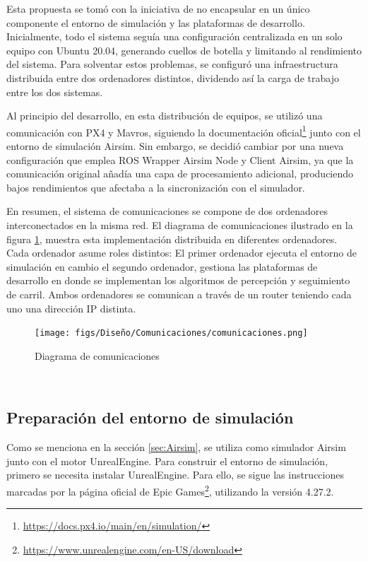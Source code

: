 Esta propuesta se tomó con la iniciativa de no encapsular en un único componente el entorno de simulación y las plataformas de desarrollo. Inicialmente, todo el sistema 
seguía una configuración centralizada en un solo equipo con Ubuntu 20.04, generando cuellos de botella y limitando al rendimiento del sistema. Para solventar estos problemas, 
se configuró una infraestructura distribuida entre dos ordenadores distintos, dividendo así la carga de trabajo entre los dos sistemas. \newline

Al principio del desarrollo, en esta distribución de equipos, se utilizó una comunicación con PX4 y Mavros, siguiendo la documentación oficial\footnote{\url{https://docs.px4.io/main/en/simulation/}} 
junto con el entorno de simulación Airsim. Sin embargo, se decidió cambiar por una nueva configuración que emplea ROS Wrapper Airsim Node y Client Airsim, ya que 
la comunicación original añadía una capa de procesamiento adicional, produciendo bajos rendimientos que afectaba a la sincronización con el simulador. 

En resumen, el sistema de comunicaciones se compone de dos ordenadores interconectados en la misma red. El diagrama 
de comunicaciones ilustrado en la figura \ref{fig:diagramadeAirsim}, muestra esta implementación distribuida en diferentes ordenadores. Cada ordenador asume roles distintos: 
El primer ordenador ejecuta el entorno de simulación en cambio el segundo ordenador, gestiona las plataformas de desarrollo en donde se implementan los algoritmos 
de percepción y seguimiento de carril. Ambos ordenadores se comunican a través de un router teniendo cada uno una dirección IP distinta. 

\newpage
\begin{figure} [H]
  \begin{center}
    \texttt{[image: figs/Diseño/Comunicaciones/comunicaciones.png]}
  \end{center}
  \caption{Diagrama de comunicaciones}
  \label{fig:diagramadeAirsim}
\end{figure}\

\subsection{Preparación del entorno de simulación}
\label{sec:Preparación_entorno}

Como se menciona en la sección \ref{sec:Airsim}, se utiliza como simulador Airsim junto con el motor UnrealEngine. Para construir el entorno de simulación, primero
se necesita instalar UnrealEngine. Para ello, se sigue las instrucciones marcadas por la página oficial de Epic Games\footnote{\url{https://www.unrealengine.com/en-US/download}}, 
utilizando la versión 4.27.2.

